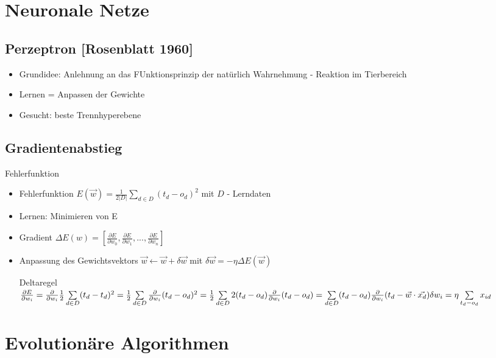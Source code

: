 \documentclass[paper=a4, fontsize=11pt]{scrartcl} %
\numberwithin{equation}{section} %
\numberwithin{figure}{section} %
\numberwithin{table}{section} %
\begin{document}
\section{Neuronale Netze}

\subsection{Perzeptron [Rosenblatt 1960]}

\begin{itemize}
\item Grundidee: Anlehnung an das FUnktionsprinzip der natürlich Wahrnehmung - Reaktion im Tierbereich
\item Lernen = Anpassen der Gewichte
\item Gesucht: beste Trennhyperebene
\end{itemize}

\subsection{Gradientenabstieg}

Fehlerfunktion
\begin{itemize}
\item Fehlerfunktion $E(\vec{w}) = \frac{1}{2|D|} \sum\limits_{d \in D}(t_d - o_d)^2$ mit $D$ - Lerndaten
\item Lernen: Minimieren von E
\item Gradient $\Delta E(w) = [\frac{\partial E}{\partial w_0}, \frac{\partial E}{\partial w_1},...,\frac{\partial E}{\partial w_n}]$
\item Anpassung des Gewichtsvektors $\vec{w} \leftarrow \vec{w} + \delta \vec{w}$ mit $\delta\vec{w} = -\eta \Delta E(\vec{w})$

Deltaregel
$\frac{\partial E}{\partial w_i} = \frac{\partial}{\partial w_i} \frac{1}{2} \sum\limits_{d \in D} (t_d - t_d)^2 = \frac{1}{2} \sum\limits_{d \in D} \frac{\partial}{\partial w_i}  (t_d-o_d)^2 = \frac{1}{2} \sum\limits_{d \in D} 2(t_d - o_d) \frac{\partial}{\partial w_i} (t_d - o_d) = \sum\limits_{d \in D}(t_d - o_d) \frac{\partial}{\partial w_i} (t_d - \vec{w} \cdot \vec{x_d})\\ \delta w_i = \eta \sum\limits_{t_d-o_d} x_{id}$
\end{itemize}

\section{Evolutionäre Algorithmen}
\end{document}
